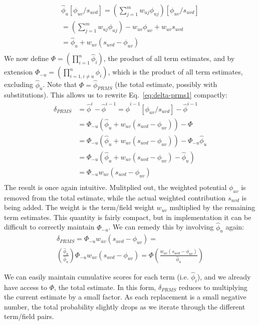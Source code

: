 \documentclass{sig-alternate}
\begin{document}
\begin{align*}
{\hat \phi}_{u}[\phi_{uv}/s_{uvd}] = \left( \sum_{j=1}^{m} w_{uj} \phi_{uj} \right)[\phi_{uv}/s_{uvd}] \\
= \left( \sum_{j=1}^{m} w_{uj} \phi_{uj} \right) - w_{uv}\phi_{uv} + w_{uv}s_{uvd} \\
= {\hat \phi}_{u} + w_{uv}(s_{uvd} - \phi_{uv}) \\
\end{align*}
We now define $\Phi = \left(\prod_{i=1}^{n} {\hat \phi}_{i} \right)$, the product of all term estimates, and by extension $\Phi_{-u} = \left(\prod_{i=1,i \neq u}^{n} {\hat \phi}_{i} \right)$, which is the product of all term estimates, excluding ${\hat \phi}_{u}$. Note that $\Phi = {\hat \phi}_{PRMS}$ (the total estimate, possibly with substitutions). This allows us to rewrite Eq.~\ref{eq:delta-prms1} compactly:
\begin{align*}
\delta_{PRMS} &= {\hat \phi^{i}} - {\hat \phi^{i-1}} = {\hat \phi^{i-1}}[\phi_{uv}/s_{uvd}] - {\hat \phi^{i-1}}\\
&=\Phi_{-u}\left( {\hat \phi}_{u} + w_{uv}(s_{uvd} - \phi_{uv}) \right) - \Phi\\
&=\Phi_{-u}\left( {\hat \phi}_{u} + w_{uv}(s_{uvd} - \phi_{uv}) \right) - \Phi_{-u}{\hat \phi}_{u} \\
&=\Phi_{-u}\left( {\hat \phi}_{u} + w_{uv}(s_{uvd} - \phi_{uv}) - {\hat \phi}_{u} \right) \\
&=\Phi_{-u} w_{uv}\left(s_{uvd} - \phi_{uv} \right) \\
\end{align*}
The result is once again intuitive. Mulitplied out, the weighted potential $\phi_{uv}$ is removed from the total estimate, while the actual weighted contribution $s_{uvd}$ is being added. The weight is the term/field weight $w_{uv}$ multiplied by the remaining term estimates. This quantity is fairly compact, but in implementation it can be difficult to correctly maintain $\Phi_{-u}$. We can remedy this by involving ${\hat \phi}_{u}$ again:
\begin{align*}
\delta_{PRMS} = \Phi_{-u} w_{uv}\left(s_{uvd} - \phi_{uv} \right) =\\
\left( \frac{{\hat \phi}_{u}}{{\hat \phi}_{u}} \right) \Phi_{-u}w_{uv}\left(s_{uvd} - \phi_{uv} \right) = \Phi\left( \frac{w_{uv}(s_{uvd} - \phi_{uv})}{{\hat \phi}_{u}} \right)
\end{align*}

We can easily maintain cumulative scores for each term (i.e. ${\hat \phi}_{i}$), and we already have access to $\Phi$, the total estimate. In this form, $\delta_{PRMS}$ reduces to multiplying the current estimate by a small factor. As each replacement is a small negative number, the total probability slightly drops as we iterate through the different term/field pairs.
\end{document}
